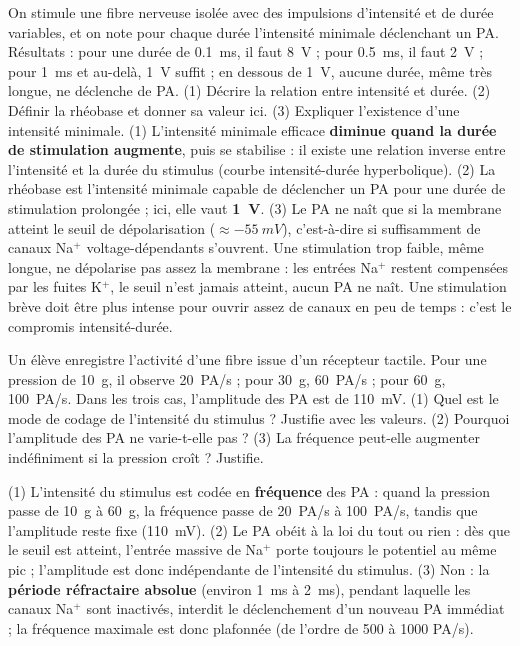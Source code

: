 \documentclass[11pt]{article}
\newcommand{\cle}[1]{{\popxbold\color{popdark}#1}}
\begin{document}
\begin{exoresolu}
On stimule une fibre nerveuse isolée avec des impulsions d'intensité et de durée variables, et on note pour chaque durée l'intensité minimale déclenchant un PA. Résultats : pour une durée de \SI{0,1}{ms}, il faut \SI{8}{V} ; pour \SI{0,5}{ms}, il faut \SI{2}{V} ; pour \SI{1}{ms} et au-delà, \SI{1}{V} suffit ; en dessous de \SI{1}{V}, aucune durée, même très longue, ne déclenche de PA. (1) Décrire la relation entre intensité et durée. (2) Définir la rhéobase et donner sa valeur ici. (3) Expliquer l'existence d'une intensité minimale.
\tcblower
(1) L'intensité minimale efficace \textbf{diminue quand la durée de stimulation augmente}, puis se stabilise : il existe une relation inverse entre l'intensité et la durée du stimulus (courbe intensité-durée hyperbolique). (2) La \cle{rhéobase} est l'intensité minimale capable de déclencher un PA pour une durée de stimulation prolongée ; ici, elle vaut \textbf{\SI{1}{V}}. (3) Le PA ne naît que si la membrane atteint le seuil de dépolarisation ($\approx \SI{-55}{mV}$), c'est-à-dire si suffisamment de canaux Na$^+$ voltage-dépendants s'ouvrent. Une stimulation trop faible, même longue, ne dépolarise pas assez la membrane : les entrées Na$^+$ restent compensées par les fuites K$^+$, le seuil n'est jamais atteint, aucun PA ne naît. Une stimulation brève doit être plus intense pour ouvrir assez de canaux en peu de temps : c'est le compromis intensité-durée.
\end{exoresolu}

\begin{exercice}
Un élève enregistre l'activité d'une fibre issue d'un récepteur tactile. Pour une pression de \SI{10}{g}, il observe \SI{20}{PA/s} ; pour \SI{30}{g}, \SI{60}{PA/s} ; pour \SI{60}{g}, \SI{100}{PA/s}. Dans les trois cas, l'amplitude des PA est de \SI{110}{mV}. (1) Quel est le mode de codage de l'intensité du stimulus ? Justifie avec les valeurs. (2) Pourquoi l'amplitude des PA ne varie-t-elle pas ? (3) La fréquence peut-elle augmenter indéfiniment si la pression croît ? Justifie.
\end{exercice}

\begin{corrige}
(1) L'intensité du stimulus est codée en \textbf{fréquence} des PA : quand la pression passe de \SI{10}{g} à \SI{60}{g}, la fréquence passe de \SI{20}{PA/s} à \SI{100}{PA/s}, tandis que l'amplitude reste fixe (\SI{110}{mV}). (2) Le PA obéit à la loi du tout ou rien : dès que le seuil est atteint, l'entrée massive de Na$^+$ porte toujours le potentiel au même pic ; l'amplitude est donc indépendante de l'intensité du stimulus. (3) Non : la \textbf{période réfractaire absolue} (environ \SI{1}{ms} à \SI{2}{ms}), pendant laquelle les canaux Na$^+$ sont inactivés, interdit le déclenchement d'un nouveau PA immédiat ; la fréquence maximale est donc plafonnée (de l'ordre de 500 à 1000 PA/s).
\end{corrige}
\end{document}

